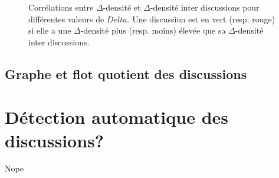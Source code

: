 \begin{figure}[!h]
\centering
{}

\caption{Corrélations entre $\Delta$-densité et $\Delta$-densité inter discussions pour différentes valeurs de $Delta$. Une discussion est en vert (resp. rouge) si elle a une $\Delta$-densité plus (resp. moins) élevée que sa $\Delta$-densité inter discussions.}
\label{fig:corel_inter_discussion}
\end{figure}

\subsection{Graphe et flot quotient des discussions}


\section{Détection automatique des discussions?}

Nope
